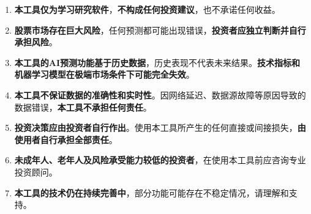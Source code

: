 \documentclass[14pt,a4paper]{ctexart}
\begin{document}
\begin{tcolorbox}[colback=red!5!white,colframe=red!75!black,title=\textbf{🔴 最高级别风险提示},fonttitle=\bfseries\large]
\begin{enumerate}[leftmargin=2em]
  \item \textbf{本工具仅为学习研究软件}，\textbf{不构成任何投资建议}，也不承诺任何收益。
  
  \item \textbf{股票市场存在巨大风险}，任何预测都可能出现错误，\textbf{投资者应独立判断并自行承担风险}。
  
  \item \textbf{本工具的AI预测功能基于历史数据}，历史表现不代表未来结果。\textbf{技术指标和机器学习模型在极端市场条件下可能完全失效}。
  
  \item \textbf{本工具不保证数据的准确性和实时性}。因网络延迟、数据源故障等原因导致的数据错误，\textbf{本工具不承担任何责任}。
  
  \item \textbf{投资决策应由投资者自行作出}。使用本工具所产生的任何直接或间接损失，\textbf{由使用者自行承担全部责任}。
  
  \item \textbf{未成年人、老年人及风险承受能力较低的投资者}，在使用本工具前应咨询专业投资顾问。
  
  \item \textbf{本工具的技术仍在持续完善中}，部分功能可能存在不稳定情况，请理解和支持。
\end{enumerate}
\end{tcolorbox}

\vspace{1em}
\end{document}
